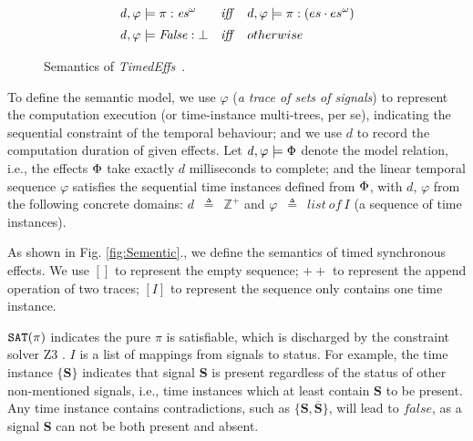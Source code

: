 \documentclass[acmsmall,review,anonymous]{acmart}\settopmatter{printfolios=true,printccs=false,printacmref=false}
\newcommand{\timedEffs}{\emph{TimedEffs}}
\newcommand{\effect}{\textcolor{black}{\ensuremath{\mathrm{\Phi}}}}
\newcommand{\code}[1]{{\tt{\ensuremath{\m{#1}}}}}
\newcommand{\esn}[2]{\ensuremath{#1^{#2}}}
\newcommand{\m}{\mathit}
\def\defeq{\ensuremath{\,\triangleq}}
\newcommand\figref[1]{Fig. \textcolor{black}{\ref{#1}}.}
\begin{document}
{\begin{figure}[!ht]
\begin{align*}
&\code{d,  \varphi \models \pi : \esn{es}{\omega}   }  
&\m{iff}\quad 
&
d, \varphi \models \pi :  (es \cdot \esn{es}{\omega} )  
\\[0.2em]
& \code{d, \varphi \models \m{False} : \bot }  
&\m{iff}\quad 
&   otherwise
\end{align*}
\caption{Semantics of \timedEffs\ .}
\label{work3_fig:Sementic}
\end{figure}


To define the semantic model, 
we use \code{\varphi} (\emph{a trace of sets of signals})  to represent the computation execution (or time-instance multi-trees, per se), indicating the sequential constraint of the temporal behaviour; and we use \code{d} to record the computation duration of given effects. 
Let \code{d, \varphi \models \effect} denote the model relation, i.e., 
the effects \code{\effect} take exactly \code{d} milliseconds to complete; and 
the linear temporal sequence \code{\varphi} satisfies the sequential time  instances defined from \code{\effect}, with \code{d}, \code{\varphi} from the following concrete domains: \code{d}  {\defeq}\  \code{\mathbb{Z^+}} and \code{\varphi}   {\defeq}\ \code{list\ of\ I} (a sequence of time instances).


As shown in \figref{fig:Sementic}, we define the semantics of timed synchronous effects. 
We use 
$[]$ to represent the empty sequence;
${+}{+}$ to represent the append operation of two traces;
\code{[I]} to represent the sequence only contains one time instance.

\code{{\tt{SAT}(\pi)} } indicates the pure \code{\pi} is satisfiable, which is discharged by the constraint solver Z3 \cite{de2008z3}.  
\code{I} is a list of mappings from signals to status. For example, the time instance $\{\textbf{S}\}$ indicates that signal \textbf{S} is present regardless of the status of other non-mentioned signals, i.e.,  time instances which at least contain $\textbf{S}$ to be present. Any time instance contains contradictions, such as $\{\textbf{S}, \overline{\textbf{S}}\}$, will lead to \code{false}, as a signal {\textbf{S}} can not be both present and absent. 







}
\end{document}
